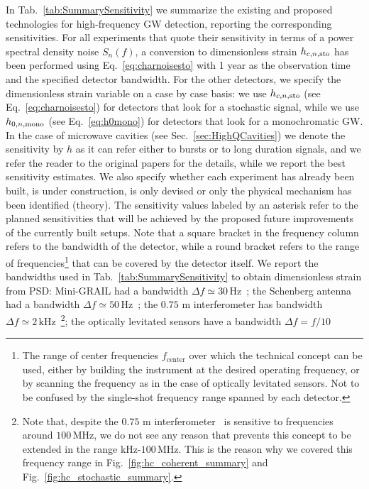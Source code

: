 \documentclass[11pt,a4paper]{article}
\begin{document}
In Tab.~\ref{tab:SummarySensitivity} we summarize the existing and proposed technologies for high-frequency GW detection, reporting the corresponding sensitivities. For all experiments that quote their sensitivity in terms of a power spectral density noise $S_n(f)$, a conversion to dimensionless strain $h_{c, n, \rm sto}$ has been performed using Eq.~\eqref{eq:charnoisesto} with 1 year as the observation time and the specified detector bandwidth. For the other detectors, we specify the dimensionless strain variable on a case by case basis: we use $h_{c, n, \rm sto}$ (see Eq.~\eqref{eq:charnoisesto}) for detectors that look for a stochastic signal, while we use $h_{0, n, \rm mono}$ (see Eq.~\eqref{eq:h0mono}) for detectors that look for a monochromatic GW. In the case of microwave cavities (see Sec.~\ref{sec:HighQCavities}) we denote the sensitivity by $h$ as it can refer either to bursts or to long duration signals, and we refer the reader to the original papers for the details, while we report the best sensitivity estimates. We also specify whether each experiment has already been built, is under construction, is only devised or only the physical mechanism has been identified (theory). {The sensitivity values labeled by an asterisk refer to the planned sensitivities that will be achieved by the proposed future improvements of the currently built setups.} Note that a square bracket in the frequency column refers to the bandwidth of the detector, while a round bracket refers to the range of frequencies\footnote{The range of center frequencies $f_\mathrm{center}$ over which the technical concept can be used, either by building the instrument at the desired operating frequency, or by scanning the frequency as in the case of optically levitated sensors. Not to be confused by the single-shot frequency range spanned by each detector.} that can be covered by the detector itself. We report the bandwidths used in Tab.~\ref{tab:SummarySensitivity} to obtain dimensionless strain from PSD: Mini-GRAIL had a bandwidth $\Delta f  \simeq 30 \, \text{Hz}$~\cite{Gottardi:2007zn}; the Schenberg antenna had a bandwidth $\Delta f \simeq 50 \, \text{Hz}$~\cite{Aguiar:2010kn}; the $0.75$ m interferometer has bandwidth $\Delta f \simeq 2 \, \text{kHz}$~\cite{akutsu}\footnote{Note that, despite the $0.75$ m interferometer~\cite{akutsu} is sensitive to frequencies around $100 \, \text{MHz}$, we do not see any reason that prevents this concept to be extended in the range kHz-$100\,$MHz. This is the reason why we covered this frequency range in Fig.~\ref{fig:hc_coherent_summary} and Fig.~\ref{fig:hc_stochastic_summary}.}; the optically levitated sensors have a bandwidth \(\Delta f = f/10\)
\end{document}
